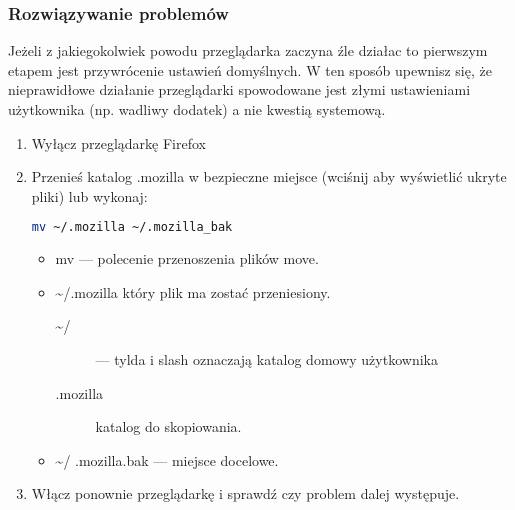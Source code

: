 \subsubsection{Rozwiązywanie problemów}
Jeżeli z jakiegokolwiek powodu przeglądarka zaczyna źle działac to pierwszym etapem jest przywrócenie ustawień domyślnych. W ten sposób upewnisz się, że nieprawidłowe działanie przeglądarki spowodowane jest złymi ustawieniami użytkownika (np. wadliwy dodatek) a nie kwestią systemową.
\begin{enumerate}
\item Wyłącz przeglądarkę Firefox
\item Przenieś katalog .mozilla w bezpieczne miejsce (wciśnij  aby wyświetlić ukryte pliki) lub wykonaj:
\begin{lstlisting}[language=bash]
mv ~/.mozilla ~/.mozilla_bak
\end{lstlisting}
\begin{itemize}
\item \textcolor{ubuntu_orange}{mv} --- polecenie przenoszenia plików move.
\item \textcolor{ubuntu_orange}{\textasciitilde /.mozilla} który plik ma zostać przeniesiony.
	\begin{description}
	\item[\textasciitilde /] --- tylda i slash oznaczają katalog domowy użytkownika
	\item[.mozilla] katalog do skopiowania.
	\end{description}
\item \textasciitilde / .mozilla.bak --- miejsce docelowe.
\end{itemize}
\item Włącz ponownie przeglądarkę i sprawdź czy problem dalej występuje.
\end{enumerate}